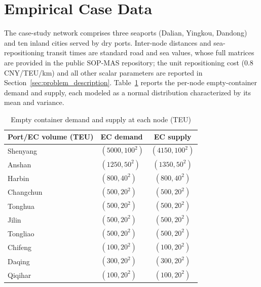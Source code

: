 \documentclass[preprint,12pt]{elsarticle}
\begin{document}
\section{Empirical Case Data}\label{app2}

The case-study network comprises three seaports (Dalian, Yingkou, Dandong) and ten inland cities served by dry ports. Inter-node distances and sea-repositioning transit times are standard road and sea values, whose full matrices are provided in the public SOP-MAS repository; the unit repositioning cost (0.8 CNY/TEU/km) and all other scalar parameters are reported in Section~\ref{sec:problem_description}. Table~\ref{tab:ec_demand_supply} reports the per-node empty-container demand and supply, each modeled as a normal distribution characterized by its mean and variance.

\begin{table}[htbp]
\centering
\caption{Empty container demand and supply at each node (TEU)}
\label{tab:ec_demand_supply}
\begin{tabular*}{0.65\textwidth}{@{\extracolsep{\fill}}llc@{}}
\toprule
Port/EC volume (TEU) & EC demand & EC supply \\
\midrule
Shenyang & $(5000, 100^2)$ & $(4150, 100^2)$ \\
Anshan & $(1250, 50^2)$ & $(1350, 50^2)$ \\
Harbin & $(800, 40^2)$ & $(800, 40^2)$ \\
Changchun & $(500, 20^2)$ & $(500, 20^2)$ \\
Tonghua & $(500, 20^2)$ & $(500, 20^2)$ \\
Jilin & $(500, 20^2)$ & $(500, 20^2)$ \\
Tongliao & $(500, 20^2)$ & $(500, 20^2)$ \\
Chifeng & $(100, 20^2)$ & $(100, 20^2)$ \\
Daqing & $(300, 20^2)$ & $(300, 20^2)$ \\
Qiqihar & $(100, 20^2)$ & $(100, 20^2)$ \\
\bottomrule
\end{tabular*}
\end{table}
\clearpage
\end{document}
